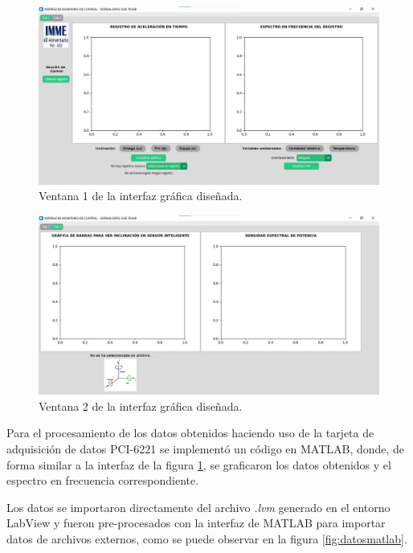 \begin{figure}[H]
    \centering
    \includegraphics[width = \textwidth]{imagenes/cap3_resultados/Ensayos/GUI1.jpg}
    \caption{Ventana 1 de la interfaz gráfica diseñada.}
    \label{fig:interfaz1}
\end{figure}

\begin{figure}[H]
    \centering
    \includegraphics[width = \textwidth]{imagenes/cap3_resultados/Ensayos/GUI2.jpg}
    \caption{Ventana 2 de la interfaz gráfica diseñada.}
    \label{fig:interfaz2}
\end{figure}

Para el procesamiento de los datos obtenidos haciendo uso de la tarjeta de adquisición de datos PCI-6221 se implementó un código en MATLAB, donde, de forma similar a la interfaz de la figura \ref{fig:interfaz1}, se graficaron los datos obtenidos y el espectro en frecuencia correspondiente.

Los datos se importaron directamente del archivo \textit{.lvm} generado en el entorno LabView y fueron pre-procesados con la interfaz de MATLAB para importar datos de archivos externos, como se puede observar en la figura \ref{fig:datosmatlab}.

